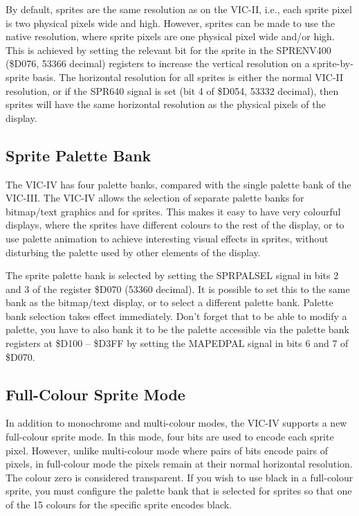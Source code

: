 By default, sprites are the same resolution as on the VIC-II, i.e., each sprite pixel is two physical pixels wide and high.
However, sprites can be made to use the native resolution, where sprite pixels are one physical pixel wide and/or high.
This is achieved by setting the relevant bit for the sprite in the SPRENV400 (\$D076, 53366 decimal) registers to increase the
vertical resolution on a sprite-by-sprite basis.  The horizontal resolution for all sprites is either the normal VIC-II resolution, or if the SPR640 signal
is set (bit 4 of \$D054, 53332 decimal), then sprites will have the same horizontal resolution as the physical pixels of the display.

\subsection{Sprite Palette Bank}

The VIC-IV has four palette banks, compared with the single palette bank of the VIC-III.
The VIC-IV allows the selection of separate palette banks for bitmap/text graphics and for sprites.  This makes it easy to have
very colourful displays, where the sprites have different colours to the rest of the display, or to use palette animation to achieve
interesting visual effects in sprites, without disturbing the palette used by other elements of the display.

The sprite palette bank is selected by setting the SPRPALSEL signal in bits 2 and 3 of the register \$D070 (53360 decimal).
It is possible to set this to the same bank as the bitmap/text display, or to select a different palette bank.
Palette bank selection takes effect immediately.  Don't forget that to be able to modify a palette, you have to also bank it
to be the palette accessible via the palette bank registers at \$D100 -- \$D3FF by setting the MAPEDPAL signal in bits 6 and 7 of
\$D070.

\subsection{Full-Colour Sprite Mode}

In addition to monochrome and multi-colour modes, the VIC-IV supports a new full-colour sprite mode.  In this mode, four bits are used to
encode each sprite pixel.  However, unlike multi-colour mode where pairs of bits encode pairs of pixels, in full-colour mode the pixels
remain at their normal horizontal resolution.  The colour zero is considered transparent. If you wish to use black in a full-colour sprite,
you must configure the palette bank that is selected for sprites so that one of the 15 colours for the specific sprite encodes black.

